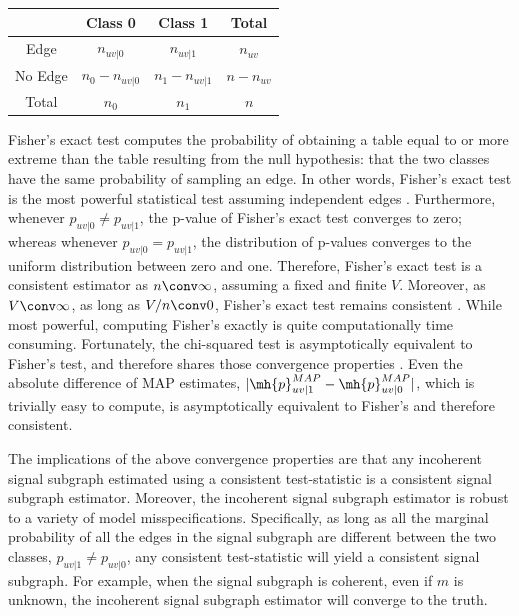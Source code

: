 \documentclass[10pt,journal,cspaper,compsoc]{IEEEtran}
\begin{document}
\begin{table}[h!]
\begin{center}
\begin{tabular}{c||c|c||c}
 & Class 0  & Class 1 & Total \\
\hline\hline
Edge & $n_{uv|0}$ & $n_{uv|1}$ & $n_{uv}$ \\ \hline
No Edge & $n_0-n_{uv|0}$ & $n_1-n_{uv|1}$ & $n-n_{uv}$ \\ \hline \hline
Total & $n_0$ & $n_1$ & $n$\\
\end{tabular}
\end{center}
\label{tab:fwpath}
\end{table}%

Fisher's exact test computes the probability of obtaining a table equal to or more extreme than the table resulting from the null hypothesis: that the two classes have the same probability of sampling an edge.  In other words, Fisher's exact test is the most powerful statistical test assuming independent edges \cite{Rice1995}.  Furthermore, whenever $p_{uv|0}\neq p_{uv|1}$, the p-value of Fisher's exact test converges to zero; whereas whenever $p_{uv|0}=p_{uv|1}$, the distribution of p-values converges to the uniform distribution between zero and one.  Therefore, Fisher's exact test is a consistent estimator as $n \conv \infty$, assuming a fixed and finite $V$.  Moreover, as $V \conv \infty$, as long as $V/n \conv 0$, Fisher's exact test remains consistent \cite{Rice1995}.  While most powerful, computing Fisher's exactly is quite computationally time consuming.  Fortunately, the chi-squared test is asymptotically equivalent to Fisher's test, and therefore shares those convergence properties \cite{Rice1995}.  Even the absolute difference of MAP estimates, $|\mh{p}_{uv|1}^{MAP}-\mh{p}_{uv|0}^{MAP}|$, which is trivially easy to compute, is asymptotically equivalent to Fisher's \cite{Rice1995} and therefore consistent.

The implications of the above convergence properties are that any incoherent signal subgraph estimated using a consistent test-statistic is a consistent signal subgraph estimator.  Moreover, the incoherent signal subgraph estimator is robust to a variety of model misspecifications.  Specifically, as long as all the marginal probability of all the edges in the signal subgraph are different between the two classes, $p_{uv|1}\neq p_{uv|0}$, any consistent test-statistic will yield a consistent signal subgraph.  For example, when the signal subgraph is coherent, even if $m$ is unknown, the incoherent signal subgraph estimator will converge to the truth.
\end{document}
